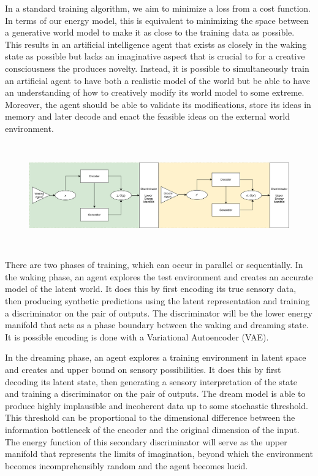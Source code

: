 \documentclass{article}
\begin{document}
In a standard training algorithm, we aim to minimize a loss from a cost function. In terms of our energy model, this is equivalent to minimizing the space between a generative world model to make it as close to the training data as possible. This results in an artificial intelligence agent that exists as closely in the waking state as possible but lacks an imaginative aspect that is crucial to for a creative consciousness the produces novelty. Instead, it is possible to simultaneously train an artificial agent to have both a realistic model of the world but be able to have an understanding of how to creatively modify its world model to some extreme. Moreover, the agent should be able to validate its modifications, store its ideas in memory and later decode and enact the feasible ideas on the external world environment. 
\begin{figure}[H]
    \centering
    \includegraphics[width=13.9cm, height=4.5cm]{wake-dream-model.png}
\end{figure}
There are two phases of training, which can occur in parallel or sequentially. In the waking phase, an agent explores the test environment and creates an accurate model of the latent world. It does this by first encoding its true sensory data, then producing synthetic predictions using the latent representation and training a discriminator on the pair of outputs. The discriminator will be the lower energy manifold that acts as a phase boundary between the waking and dreaming state. It is possible encoding is done with a Variational Autoencoder (VAE).

In the dreaming phase, an agent explores a training environment in latent space and creates and upper bound on sensory possibilities. It does this by first decoding its latent state, then generating a sensory interpretation of the state and training a discriminator on the pair of outputs. The dream model is able to produce highly implausible and incoherent data up to some stochastic threshold. This threshold can be proportional to the dimensional difference between the information bottleneck of the encoder and the original dimension of the input. The energy function of this secondary discriminator will serve as the upper manifold that represents the limits of imagination, beyond which the environment becomes incomprehensibly random and the agent becomes lucid.
\end{document}
